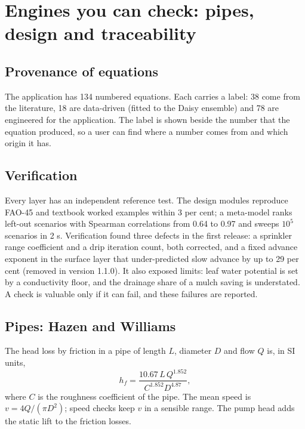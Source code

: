 \chapter{Engines you can check: pipes, design and traceability}

\section{Provenance of equations}
The application has 134 numbered equations. Each carries a label: 38 come from the literature, 18 are data-driven (fitted to the Daisy ensemble) and 78 are engineered for the application. The label is shown beside the number that the equation produced, so a user can find where a number comes from and which origin it has.

\section{Verification}
Every layer has an independent reference test. The design modules reproduce FAO-45 and textbook worked examples within 3 per cent; a meta-model ranks left-out scenarios with Spearman correlations from 0.64 to 0.97 and sweeps $10^{5}$ scenarios in 2 s. Verification found three defects in the first release: a sprinkler range coefficient and a drip iteration count, both corrected, and a fixed advance exponent in the surface layer that under-predicted slow advance by up to 29 per cent (removed in version 1.1.0). It also exposed limits: leaf water potential is set by a conductivity floor, and the drainage share of a mulch saving is understated. A check is valuable only if it can fail, and these failures are reported.


\section{Pipes: Hazen and Williams}
The head loss by friction in a pipe of length $L$, diameter $D$ and flow $Q$ is, in SI units,
\begin{equation}\label{eq:hw}\boxed{h_f=\frac{10.67\,L\,Q^{1.852}}{C^{1.852}D^{4.87}},}\end{equation}
where $C$ is the roughness coefficient of the pipe. The mean speed is $v=4Q/(\pi D^2)$; speed checks keep $v$ in a sensible range. The pump head adds the static lift to the friction losses.

